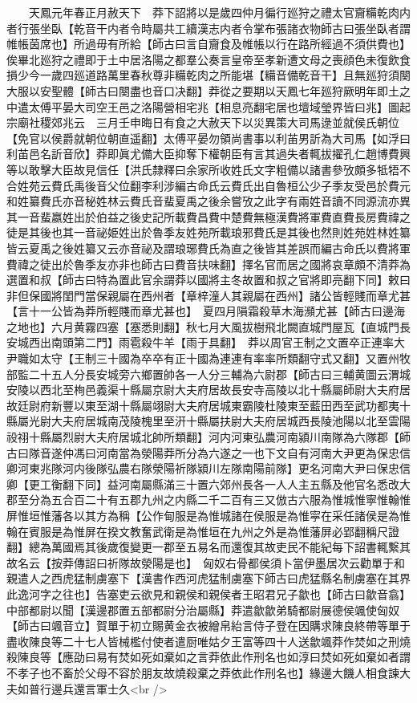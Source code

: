 　　天鳳元年春正月赦天下　莽下詔將以是歲四仲月徧行廵狩之禮太官齎糒乾肉内者行張坐臥【乾音干内者令時屬共工續漢志内者令掌布張諸衣物師古曰張坐臥者謂帷帳茵席也】所過毋有所給【師古曰言自齎食及帷帳以行在路所經過不須供費也】俟畢北廵狩之禮即于土中居洛陽之都羣公奏言皇帝至孝新遭文母之喪顔色未復飲食損少今一歲四廵道路萬里春秋尊非糒乾肉之所能堪【糒音備乾音干】且無廵狩須闋大服以安聖體【師古曰闋盡也音口决翻】莽從之要期以天鳳七年廵狩厥明年即土之中遣太傅平晏大司空王邑之洛陽營相宅兆【相息亮翻宅居也壇域瑩界皆曰兆】圖起宗廟社稷郊兆云　三月壬申晦日有食之大赦天下以災異策大司馬逯並就侯氏朝位【免官以侯爵就朝位朝直遥翻】太傅平晏勿領尚書事以利苖男訢為大司馬【如浮曰利苖邑名訢音欣】莽即眞尤備大臣抑奪下權朝臣有言其過失者輒拔擢孔仁趙博費興等以敢擊大臣故見信任【洪氏隸釋曰余家所收姓氏文字粗備以諸書參攷頗多牴牾不合姓苑云費氏禹後音父位翻李利涉編古命氏云費氏出自魯桓公少子季友受邑於費元和姓纂費氏亦音秘姓林云費氏音蜚夏禹之後余嘗攷之此字有兩姓音讀不同源流亦異其一音蜚嬴姓出於伯益之後史記所載費昌費中楚費無極漢費將軍費直費長房費禕之徒是其後也其一音祕姫姓出於魯季友姓苑所載琅邪費氏是其後也然則姓苑姓林姓纂皆云夏禹之後姓纂又云亦音祕及謂琅琊費氏為直之後皆其差誤而編古命氏以費將軍費禕之徒出於魯季友亦非也師古曰費音扶味翻】擇名官而居之國將哀章頗不清莽為選置和叔【師古曰特為置此官余謂莽以國將主冬故置和叔之官將即亮翻下同】敕曰非但保國將閨門當保親屬在西州者【章梓潼人其親屬在西州】諸公皆輕賤而章尤甚【言十一公皆為莽所輕賤而章尤甚也】　夏四月隕霜殺草木海瀕尤甚【師古曰邊海之地也】六月黄霧四塞【塞悉則翻】秋七月大風拔樹飛北闕直城門屋瓦【直城門長安城西出南頭第二門】雨雹殺牛羊【雨于具翻】　莽以周官王制之文置卒正連率大尹職如太守【王制三十國為卒卒有正十國為連連有率率所類翻守式又翻】又置州牧部監二十五人分長安城旁六鄉置帥各一人分三輔為六尉郡【師古曰三輔黄圖云渭城安陵以西北至栒邑義渠十縣屬京尉大夫府居故長安寺高陵以北十縣屬師尉大夫府居故廷尉府新豐以東至湖十縣屬翊尉大夫府居城東霸陵杜陵東至藍田西至武功都夷十縣屬光尉大夫府居城南茂陵槐里至汧十縣屬扶尉大夫府居城西長陵池陽以北至雲陽祋祤十縣屬烈尉大夫府居城北帥所類翻】河内河東弘農河南潁川南隊為六隊郡【師古曰隊音遂仲馮曰河南當為滎陽莽所分為六遂之一也下文自有河南大尹更為保忠信卿河東兆隊河内後隊弘農右隊滎陽祈隊潁川左隊南陽前隊】更名河南大尹曰保忠信卿【更工衡翻下同】益河南屬縣滿三十置六郊州長各一人人主五縣及他官名悉改大郡至分為五合百二十有五郡九州之内縣二千二百有三又倣古六服為惟城惟寧惟翰惟屏惟垣惟藩各以其方為稱【公作甸服是為惟城諸在侯服是為惟寜在采任諸侯是為惟翰在賓服是為惟屏在揆文教奮武衛是為惟垣在九州之外是為惟藩屏必郢翻稱尺證翻】總為萬國焉其後歲復變更一郡至五易名而還復其故吏民不能紀每下詔書輒繫其故名云【按莽傳詔曰祈隊故滎陽是也】　匈奴右骨都侯須卜當伊墨居次云勸單于和親遣人之西虎猛制虜塞下【漢書作西河虎猛制虜塞下師古曰虎猛縣名制虜塞在其界此逸河字之往也】告塞吏云欲見和親侯和親侯者王昭君兄子歙也【師古曰歙音翕】中部都尉以聞【漢邊郡置五部都尉分治屬縣】莽遣歙歙弟騎都尉展德侯颯使匈奴【師古曰颯音立】賀單于初立賜黄金衣被繒帛紿言侍子登在因購求陳良終帶等單于盡收陳良等二十七人皆械檻付使者遣厨唯姑夕王富等四十人送歙颯莽作焚如之刑燒殺陳良等【應劭曰易有焚如死如棄如之言莽依此作刑名也如淳曰焚如死如棄如者謂不孝子也不畜於父母不容於朋友故燒殺棄之莽依此作刑名也】緣邊大饑人相食諫大夫如普行邊兵還言軍士久<br />
